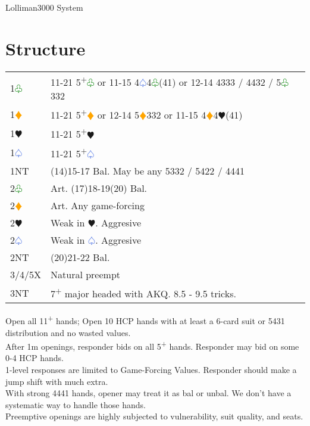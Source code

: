 \documentclass{article}
\renewcommand{\sp}{\textcolor{RoyalBlue}{$\varspade$}}
\newcommand{\he}{\textcolor{RubineRed}{$\varheart$}}
\newcommand{\di}{\textcolor{Orange}{$\vardiamond$}}
\newcommand{\cl}{\textcolor{Green}{$\varclub$}}
\newcommand{\nt}{\relsize{-1}NT\relsize{1}}
\newcommand{\up}{\textsuperscript{+}}
\begin{document}
\normalfont
\twocolumn
\setlength{\columnseprule}{0.5pt}
\Large{Lolliman3000 System}
\normalsize
\tableofcontents

\vfill\eject

\section{Structure}

\begin{tabular}{|l|p{6.5cm}}
	1\cl{} & 11-21 5\up\cl{} or 11-15 4\sp{}4\cl{}(41) or 12-14 4333 / 4432 / 5\cl{}332 \\
	1\di{} & 11-21 5\up\di{} or 12-14 5\di{}332 or 11-15 4\di{}4\he{}(41) \\
	1\he{} & 11-21 5\up\he{} \\
	1\sp{} & 11-21 5\up\sp{} \\
	1\nt{} & (14)15-17 Bal. May be any 5332 / 5422 / 4441 \\
	2\cl{} & Art. (17)18-19(20) Bal. \\
	2\di{} & Art. Any game-forcing \\
	2\he{} & Weak in \he{}. Aggresive \\
	2\sp{} & Weak in \sp{}. Aggresive \\
	2\nt & (20)21-22 Bal. \\
	3/4/5X & Natural preempt \\
	3\nt & 7\up{} major headed with AKQ. 8.5 - 9.5 tricks. \\
\end{tabular}

\medskip

Open all 11\up{} hands; Open 10 HCP hands with at least a 6-card suit or 5431 distribution and no wasted values. \\

After 1m openings, responder bids on all 5\up{} hands. Responder may bid on some 0-4 HCP hands. \\

1-level responses are limited to Game-Forcing Values. Responder should make a jump shift with much extra. \\

With strong 4441 hands, opener may treat it as bal or unbal. We don't have a systematic way to handle those hands. \\

Preemptive openings are highly subjected to vulnerability, suit quality, and seats.
\end{document}
